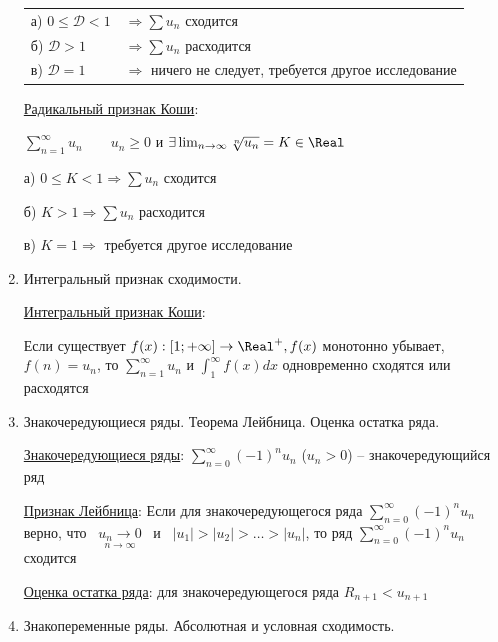 \begin{enumerate}
    \begin{tabular}{ll}
        а) $0 \leq \mathcal{D} < 1$ & $\Longrightarrow \sum u_n$ сходится                                \\

        б) $\mathcal{D} > 1$        & $\Longrightarrow \sum u_n$ расходится                              \\

        в) $\mathcal{D} = 1$        & $\Longrightarrow$ ничего не следует, требуется другое исследование \\
    \end{tabular}

    \hyperlink{cauchyradicalsign}{Радикальный признак Коши}:

    $\sum_{n = 1}^\infty u_n \quad\quad u_n \geq 0$ и $\exists \lim_{n \to \infty} \sqrt[n]{u_n} = K \in \Real$

    а) $0 \leq K < 1 \Longrightarrow \sum u_n$ сходится

    б) $K > 1 \Longrightarrow \sum u_n$ расходится

    в) $K = 1 \Longrightarrow$ требуется другое исследование

    \item Интегральный признак сходимости.

    \hyperlink{cauchyintegralsign}{Интегральный признак Коши}:

    Если существует $f(x) : [1; +\infty] \to \Real^+, f(x)$ монотонно убывает, $f(n) = u_n$, то $\sum_{n = 1}^\infty u_n$ и $\int_{1}^\infty f(x) dx$ одновременно сходятся или расходятся

    \item Знакочередующиеся ряды. Теорема Лейбница. Оценка остатка ряда.

    \hyperlink{alternatingsignseries}{Знакочередующиеся ряды}: $\sum_{n = 0}^\infty (-1)^n u_n$ ($u_n > 0$) -- знакочередующийся ряд

    \hyperlink{leibniztheorem}{Признак Лейбница}: Если для знакочередующегося ряда $\sum_{n = 0}^\infty (-1)^n u_n$ верно,
    что \ $\underset{n \to \infty}{u_n \to 0}$ \ и \ $|u_1| > |u_2| > \dots > |u_n|$,
    то ряд $\sum_{n = 0}^\infty (-1)^n u_n$ сходится

    \hyperlink{seriesremainderevaluation}{Оценка остатка ряда}: для знакочередующегося ряда $R_{n + 1} < u_{n + 1}$

    \item Знакопеременные ряды. Абсолютная и условная сходимость.


\end{enumerate}
